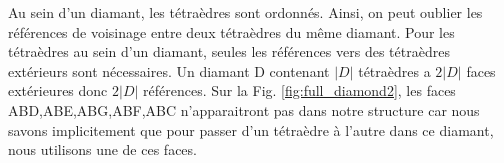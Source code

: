 \documentclass[a4paper,11pt,openany]{article}
\begin{document}
\noindent
Au sein d'un diamant, les tétraèdres sont ordonnés. Ainsi, on peut oublier les références de voisinage entre deux tétraèdres du même diamant. Pour les tétraèdres au sein d'un diamant, seules les références vers des tétraèdres extérieurs sont nécessaires. Un diamant D contenant $|D|$ tétraèdres a $2|D|$ faces extérieures donc $2|D|$ références.
Sur la Fig. \ref{fig:full_diamond2}, les faces ABD,ABE,ABG,ABF,ABC n'apparaitront pas dans notre structure car nous savons implicitement que pour passer d'un tétraèdre à l'autre dans ce diamant, nous utilisons une de ces faces.
\end{document}
